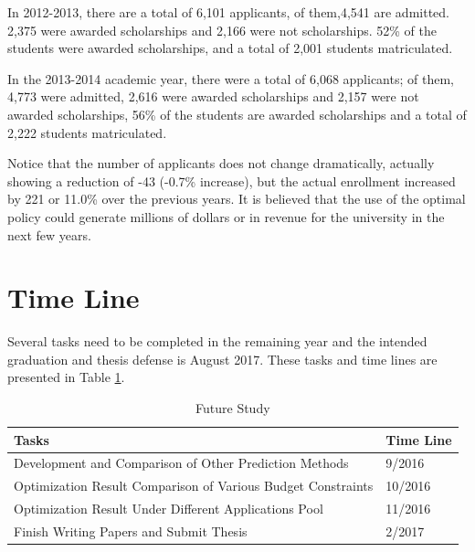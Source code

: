 \documentclass[12pt,english]{report}
\begin{document}
In 2012-2013, there are a total of 6,101 applicants, of them,4,541   are admitted. 2,375 were awarded scholarships and 2,166 were not scholarships. 52\% of the students were awarded scholarships, and a total of 2,001 students matriculated. 

In the 2013-2014 academic year, there were a total of 6,068 applicants; of them, 4,773 were admitted, 2,616 were awarded scholarships and 2,157 were not awarded scholarships, 56\% of the students are awarded scholarships and a total of 2,222 students matriculated. 

Notice that the number of applicants does not change dramatically, actually showing a reduction of -43 (-0.7\% increase), but the actual enrollment increased by 221  or 11.0\% over the previous years.  It is believed that the use of the optimal policy could generate millions of dollars or in revenue for the university in the next few years. 

\section{Time Line}

Several tasks need to be completed in the remaining year and the intended graduation and thesis defense is August 2017.  These tasks and time lines are presented in Table \ref{timeline}. 

\begin{table}[ht]
\centering

\begin{tabular}{|l|l|}
\hline
Tasks                                                                & Time Line \\ \hline
Development and Comparison of Other Prediction Methods               &  9/2016               \\ \hline
Optimization Result Comparison of Various Budget Constraints          & 10/2016               \\ \hline
Optimization Result Under Different Applications Pool			 &       11/2016          \\ \hline
Finish Writing Papers and Submit Thesis                             		&  2/2017               \\ \hline
\end{tabular}
\caption{Future Study}
    \label{timeline}
\end{table}
\end{document}
